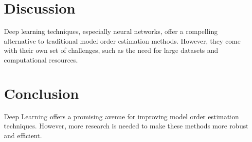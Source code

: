 \section{Discussion}
Deep learning techniques, especially neural networks, offer a compelling alternative to traditional model order
estimation methods. However, they come with their own set of challenges, such as the need for large datasets and
computational resources.

\section{Conclusion}
Deep Learning offers a promising avenue for improving model order estimation techniques. However, more research
is needed to make these methods more robust and efficient.
\endinput





